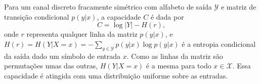 \begin{theorem}
Para um canal discreto fracamente simétrico com alfabeto de saída $\mathcal{Y}$
e matriz de transição condicional $p(y|x)$, a capacidade $C$ é dada por
\begin{equation}
C = \log |Y| - H(r),
\end{equation}
onde $r$ representa qualquer linha da matriz $p(y|x)$, e 
$H(r) = H(Y|X=x) = -\sum_{y \in \mathcal{Y}} p(y|x) \log p(y|x)$ 
é a entropia condicional da saída
dado um símbolo de entrada $x$. Como as linhas da matriz são permutações umas
das outras, $H(Y|X=x)$ é a mesma para todo $x \in \mathcal{X}$. Essa capacidade é
atingida com uma distribuição uniforme sobre as entradas.
\end{theorem}


